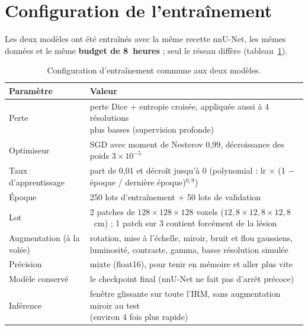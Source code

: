 \section{Configuration de l'entraînement}
\label{sec:anas-entrainement}

Les deux modèles ont été entraînés avec la même recette nnU-Net, les mêmes données et le même \textbf{budget de 8~heures} ; seul le réseau diffère (tableau~\ref{tab:anas-config}).

\begin{table}[htbp]
  \centering
  \caption{Configuration d'entraînement commune aux deux modèles.}
  \label{tab:anas-config}
  \small
  \begin{tabular}{ll}
    \toprule
    Paramètre & Valeur \\
    \midrule
    Perte & \makecell[l]{perte Dice + entropie croisée, appliquée aussi à 4 résolutions\\plus basses (supervision profonde)} \\
    Optimiseur & SGD avec moment de Nesterov 0,99, décroissance des poids $3 \times 10^{-5}$ \\
    Taux d'apprentissage & \makecell[l]{part de 0,01 et décroît jusqu'à 0\\(polynomial : lr $\times$ (1 $-$ époque / dernière époque)$^{0,9}$)} \\
    Époque & 250 lots d'entraînement + 50 lots de validation \\
    Lot & \makecell[l]{2 patches de $128 \times 128 \times 128$ voxels ($12{,}8 \times 12{,}8 \times 12{,}8$~cm) ;\\1 patch sur 3 contient forcément de la lésion} \\
    Augmentation (à la volée) & \makecell[l]{rotation, mise à l'échelle, miroir, bruit et flou gaussiens,\\luminosité, contraste, gamma, basse résolution simulée} \\
    Précision & mixte (float16), pour tenir en mémoire et aller plus vite \\
    Modèle conservé & le checkpoint final (nnU-Net ne fait pas d'arrêt précoce) \\
    Inférence & \makecell[l]{fenêtre glissante sur toute l'IRM, sans augmentation miroir au test\\(environ 4 fois plus rapide)} \\
    \bottomrule
  \end{tabular}
\end{table}

